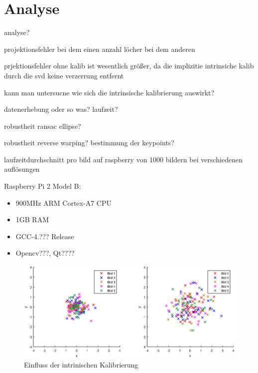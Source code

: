 \chapter{Analyse}
analyse?

projektionsfehler bei dem einen
anzahl löcher bei dem anderen

prjektionsfehler ohne kalib ist wesentlich größer, da die implizitie intrinsiche kalib durch die svd keine verzerrung entfernt

kann man untersucne wie sich die intrinsische kalibrierung auswirkt?

datenerhebung oder so was? laufzeit?

robustheit ransac ellipse?

robustheit reverse warping? bestimmung der keypoints?

laufzeitdurchschnitt pro bild  auf raspberry von 1000 bildern bei verschiedenen auflösungen

Raspberry Pi 2 Model B:
\begin{itemize}
	\item 900MHz ARM Cortex-A7 CPU
	\item 1GB RAM
	\item GCC-4.??? Release
	\item Opencv???, Qt????
\end{itemize}


\begin{figure}[!htb]
	\centering
	\includegraphics[width=\textwidth]{images/reprojectionErrorReverse.eps}
	\caption{Einfluss der intrinischen Kalibrierung}
	\label{fig:influenceCalib}
\end{figure}


